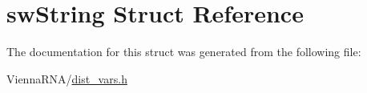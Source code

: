\hypertarget{structswString}{}\section{sw\+String Struct Reference}
\label{structswString}


The documentation for this struct was generated from the following file\+:\begin{DoxyCompactItemize}
\item 
Vienna\+R\+N\+A/\hyperlink{dist__vars_8h}{dist\+\_\+vars.\+h}\end{DoxyCompactItemize}
